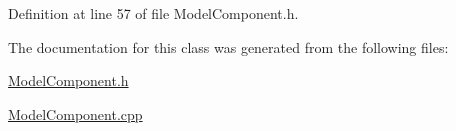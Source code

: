 Definition at line 57 of file Model\-Component.\-h.



The documentation for this class was generated from the following files\-:\begin{DoxyCompactItemize}
\item 
\hyperlink{_model_component_8h}{Model\-Component.\-h}\item 
\hyperlink{_model_component_8cpp}{Model\-Component.\-cpp}\end{DoxyCompactItemize}
